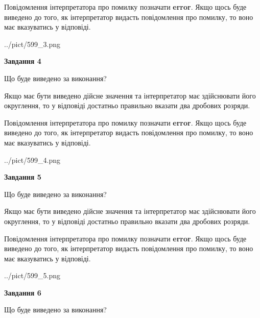 \documentclass[12pt, ukrainian]{article}
\begin{document}
{\begin {Large}
Повідомлення інтерпретатора про помилку позначати \textbf{error}.
Якщо щось буде виведено до того, як інтерпретатор видасть повідомлення про помилку, 
то воно має вказуватись у відповіді. \par

\begin{center}
	{../pict/599_3.png}
\end{center}
\newpage

{\begin {center}\textbf{Завдання 4}\end {center}}\par
Що буде виведено за виконання? \par

Якщо має бути виведено дійсне значення та інтерпретатор має здійснювати його округлення, 
то у відповіді достатньо правильно вказати два дробових розряди.

Повідомлення інтерпретатора про помилку позначати \textbf{error}.
Якщо щось буде виведено до того, як інтерпретатор видасть повідомлення про помилку, 
то воно має вказуватись у відповіді. \par

\begin{center}
	{../pict/599_4.png}
\end{center}
\newpage

{\begin {center}\textbf{Завдання 5}\end {center}}\par
Що буде виведено за виконання? \par

Якщо має бути виведено дійсне значення та інтерпретатор має здійснювати його округлення, 
то у відповіді достатньо правильно вказати два дробових розряди.

Повідомлення інтерпретатора про помилку позначати \textbf{error}.
Якщо щось буде виведено до того, як інтерпретатор видасть повідомлення про помилку, 
то воно має вказуватись у відповіді. \par

\begin{center}
	{../pict/599_5.png}
\end{center}
\newpage

{\begin {center}\textbf{Завдання 6}\end {center}}\par
Що буде виведено за виконання? \par


\end{Large}}
\end{document}

